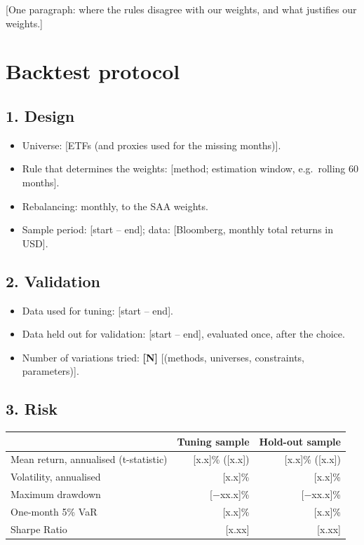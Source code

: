 \documentclass[11pt,a4paper]{article}
\newcommand{\todo}[1]{\textcolor{BrickRed}{[#1]}}
\begin{document}
\todo{One paragraph: where the rules disagree with our weights, and what justifies our weights.}

\vspace{1.5em}
\section*{Backtest protocol}

\subsection*{1. Design}
\begin{itemize}
  \item Universe: \todo{ETFs (and proxies used for the missing months)}.
  \item Rule that determines the weights: \todo{method; estimation window, e.g.\ rolling 60 months}.
  \item Rebalancing: monthly, to the SAA weights.
  \item Sample period: \todo{start -- end}; data: \todo{Bloomberg, monthly total returns in USD}.
\end{itemize}

\subsection*{2. Validation}
\begin{itemize}
  \item Data used for tuning: \todo{start -- end}.
  \item Data held out for validation: \todo{start -- end}, evaluated once, after the choice.
  \item Number of variations tried: \textbf{\todo{N}} \todo{(methods, universes, constraints, parameters)}.
\end{itemize}

\subsection*{3. Risk}
\begin{center}
\begin{tabular}{@{}lrr@{}}
\toprule
 & Tuning sample & Hold-out sample \\
\midrule
Mean return, annualised (t-statistic) & \todo{x.x}\% (\todo{x.x}) & \todo{x.x}\% (\todo{x.x}) \\
Volatility, annualised                & \todo{x.x}\% & \todo{x.x}\% \\
Maximum drawdown                      & \todo{$-$xx.x}\% & \todo{$-$xx.x}\% \\
One-month 5\% VaR                     & \todo{x.x}\% & \todo{x.x}\% \\
Sharpe Ratio                          & \todo{x.xx} & \todo{x.xx} \\
\bottomrule
\end{tabular}
\end{center}
\end{document}
